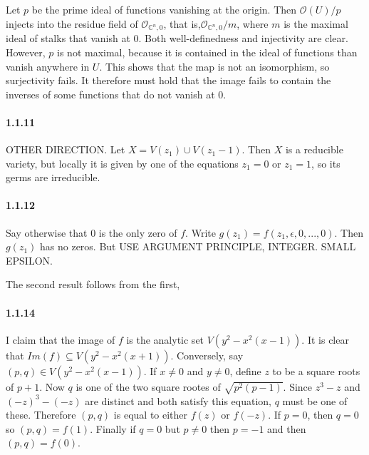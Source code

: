 \documentclass[10pt,letter]{article}
\begin{document}
Let $p$ be the prime ideal of functions vanishing at the origin. Then $\mathcal{O}(U)/p$ injects into the residue field of  $\mathcal{O}_{\mathbb{C}^n,0}$, that is,$ \mathcal{O}_{\mathbb{C}^n,0}/m$, where $m$ is the maximal ideal of stalks that vanish at $0$. Both well-definedness and injectivity are clear. However, $p$ is not maximal, because it is contained in the ideal of functions than vanish anywhere in $U$. This shows that the map is not an isomorphism, so surjectivity fails. It therefore must hold that the image fails to contain the inverses of some functions that do not vanish at $0$.
 
\paragraph*{1.1.11} OTHER DIRECTION. Let $X = V(z_1) \cup V(z_1-1)$. Then $X$ is a reducible variety, but locally it is given by one of the equations $z_1 = 0$ or $z_1 = 1$, so its germs are irreducible.

\paragraph*{1.1.12} Say otherwise that $0$ is the only zero of $f$. Write $g(z_1) = f(z_1,\epsilon,0,...,0)$. Then $g(z_1)$ has no zeros.  But USE ARGUMENT PRINCIPLE, INTEGER. SMALL EPSILON.

The second result follows from the first, 

\paragraph*{1.1.14} I claim that the image of $f$ is the analytic set $V(y^2-x^2(x-1))$. It is clear that $Im(f) \subseteq V(y^2-x^2(x+1))$. Conversely, say $(p,q) \in V(y^2-x^2(x-1))$. If $x \neq 0$ and $y \neq 0$, define $z$ to be a square roots of $p+1$. Now $q$ is one of the two square rootes of $\sqrt{p^2(p-1)}$. Since $z^3-z$ and $(-z)^3-(-z)$ are distinct and both satisfy this equation, $q$ must be one of these. Therefore $(p,q)$ is equal to either $f(z)$ or $f(-z)$. If $p = 0$, then $q = 0$ so $(p,q) = f(1)$. Finally if $q = 0$ but $p \neq 0$ then $p = -1$ and then $(p,q) = f(0)$.  
\end{document}
